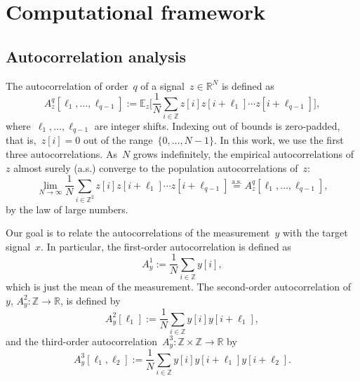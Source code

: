 \documentclass{article}
\begin{document}
\section{Computational framework}
\label{sec:math}
\subsection{Autocorrelation analysis}
\label{subsec:ac}
The autocorrelation of order~$q$ of a signal~\mbox{$z \in \mathbb{R}^{N}$} is defined as
\begin{equation}
A_z^q[\ell_1, \ldots, \ell_{q-1}] := \mathbb{E}_z\Big[\frac{1}{N} \sum_{i \in \mathbb{Z}} z[i] z[i + \ell_1] \cdots z[i + \ell_{q-1}]\Big],
\end{equation}
where~$\ell_1, \ldots, \ell_{q-1}$ are integer shifts. Indexing out of bounds is zero-padded, that is,~\mbox{$z[i] = 0$} out of the range~\mbox{$\{0, \ldots, {N-1}\}$}. In this work, we use the first three autocorrelations. As~$N$ grows indefinitely, the empirical autocorrelations of~$z$ almost surely (a.s.) converge to the population autocorrelations of~$z$:
\begin{equation}
\lim_{N \rightarrow \infty} \frac{1}{N} \sum_{i \in \mathbb{Z}^2} z[i] z[i + \ell_1] \cdots z[i + \ell_{q-1}] \stackrel{\text{a.s.}}{=}A_z^q[\ell_1, \ldots, \ell_{q-1}],
\end{equation}
by the law of large numbers.

Our goal is to relate the autocorrelations of the measurement~$y$ with the target signal~$x$. In particular, the first-order autocorrelation is defined as
\begin{equation}
A_{y}^1 := \frac{1}{N} \sum_{i \in \mathbb{Z}} y[i],
\end{equation}
which is just the mean of the measurement. The second-order autocorrelation of~$y$, \mbox{$A_{y}^2: \mathbb{Z} \rightarrow \mathbb{R}$}, is defined by
\begin{equation}
A_{y}^2 [\ell_1] := \frac{1}{N} \sum_{i \in \mathbb{Z}} y[i] y[i + \ell_1],
\end{equation}
and the third-order autocorrelation~\mbox{$A_{y}^3: \mathbb{Z} \times \mathbb{Z} \rightarrow \mathbb{R}$} by
\begin{equation}
A_{y}^3 [\ell_1, \ell_2] := \frac{1}{N} \sum_{i \in \mathbb{Z}} y[i] y[i + \ell_1] y[i + \ell_2].
\end{equation}
\end{document}
